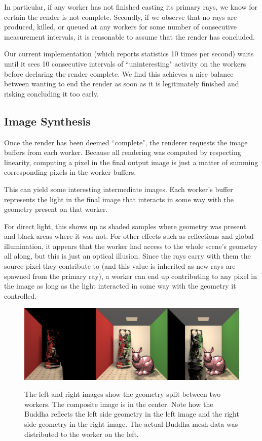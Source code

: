 \documentclass[12pt]{ucthesis}
\newcommand{\captionfonts}{\small\bf\ssp}
\begin{document}
In particular, if any worker has not finished casting its primary rays, we
know for certain the render is not complete. Secondly, if we observe that no
rays are produced, killed, or queued at any workers for some number of
consecutive measurement intervals, it is reasonable to assume that the render
has concluded.

Our current implementation (which reports statistics 10 times per second)
waits until it sees 10 consecutive intervals of ``uninteresting" activity on
the workers before declaring the render complete. We find this achieves a nice
balance between wanting to end the render as soon as it is legitimately
finished and risking concluding it too early.

\subsection{Image Synthesis}
\label{synthesis}

Once the render has been deemed ``complete", the renderer requests the image
buffers from each worker. Because all rendering was computed by respecting
linearity, computing a pixel in the final output image is just a matter
of summing corresponding pixels in the worker buffers.

This can yield some interesting intermediate images. Each worker's buffer
represents the light in the final image that interacts in some way with the
geometry present on that worker.

For direct light, this shows up as shaded samples where geometry was present
and black areas where it was not. For other effects such as reflections and
global illumination, it appears that the worker had access to the whole scene's
geometry all along, but this is just an optical illusion. Since the rays
carry with them the source pixel they contribute to (and this value is inherited
as new rays are spawned from the primary ray), a worker can end up contributing
to any pixel in the image as long as the light interacted in some way with the
geometry it controlled.

\begin{figure}[h!]
    \centering
    \includegraphics[width=140mm]{images/linearity.png}
    \captionfonts
    \caption{The left and right images show the geometry split between two workers. The composite image is in the center. Note how the Buddha reflects the left side geometry in the left image and the right side geometry in the right image. The actual Buddha mesh data was distributed to the worker on the left.}
    \label{fig:linearity}
\end{figure}
\end{document}

